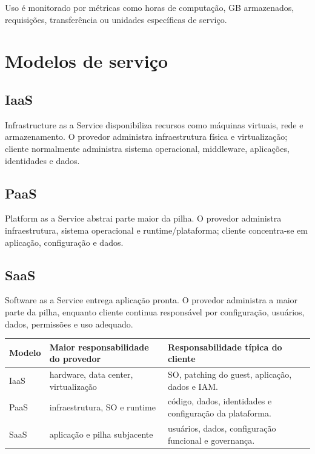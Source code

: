 Uso é monitorado por métricas como horas de computação, GB armazenados, requisições, transferência ou unidades específicas de serviço.

\section{Modelos de serviço}

\subsection{IaaS}

Infrastructure as a Service disponibiliza recursos como máquinas virtuais, rede e armazenamento. O provedor administra infraestrutura física e virtualização; cliente normalmente administra sistema operacional, middleware, aplicações, identidades e dados.

\subsection{PaaS}

Platform as a Service abstrai parte maior da pilha. O provedor administra infraestrutura, sistema operacional e runtime/plataforma; cliente concentra-se em aplicação, configuração e dados.

\subsection{SaaS}

Software as a Service entrega aplicação pronta. O provedor administra a maior parte da pilha, enquanto cliente continua responsável por configuração, usuários, dados, permissões e uso adequado.

\begin{table}[ht]
\centering
\small
\begin{tabularx}{\textwidth}{l X X}
\toprule
Modelo & Maior responsabilidade do provedor & Responsabilidade típica do cliente \\
\midrule
IaaS & hardware, data center, virtualização & SO, patching do guest, aplicação, dados e IAM. \\
PaaS & infraestrutura, SO e runtime & código, dados, identidades e configuração da plataforma. \\
SaaS & aplicação e pilha subjacente & usuários, dados, configuração funcional e governança. \\
\bottomrule
\end{tabularx}
\end{table}

